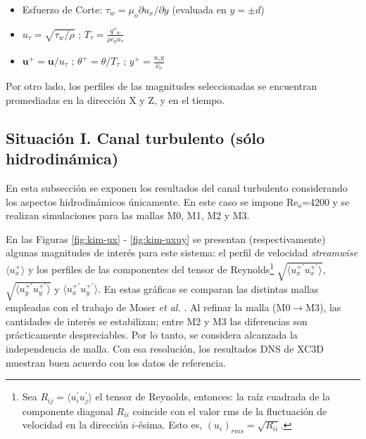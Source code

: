 \begin{itemize}
	\item Esfuerzo de Corte: $\tau_w= \mu_o \partial u_x / \partial y$ (evaluada en $y=\pm d$)  
	\item $u_{\tau} = \sqrt{\tau_w / \rho}$ ; $T_{\tau}=\frac{q''_w}{\rho c_p u_{\tau}}$
	\item $\mathbf{u}^+ = \mathbf{u} / u_{\tau}$ ; $\theta^+ = \theta / T_{\tau}$ ; $y^+ = \frac{u_{\tau} y}{\nu_o}$
\end{itemize}
Por otro lado, los perfiles de las magnitudes seleccionadas se encuentran promediadas en la dirección X y Z, y en el tiempo.

\subsection{Situación I. Canal turbulento (sólo hidrodinámica)}

En esta subsección se exponen los resultados del canal turbulento considerando los \linebreak aspectos hidrodinámicos únicamente. En este caso se impone Re$_o$=4200 y se realizan \linebreak simulaciones para las mallas M0, M1, M2 y M3.  

En las Figuras \ref{fig:kim-ux} - \ref{fig:kim-uxuy} se presentan (respectivamente) algunas magnitudes de interés para este sistema: el perfil de velocidad \textit{streamwise} $\langle u^+_x \rangle$ y los perfiles de las componentes del tensor de Reynolds\footnote{Sea $R_{ij} = \langle u^{\prime}_i u^{\prime}_j \rangle$ el tensor de Reynolds, entonces: la raíz cuadrada de la componente diagonal $R_{ii}$ coincide con el valor rms de la fluctuación de velocidad en la dirección $i$-ésima. Esto es, $(u_i)_{rms} = \sqrt{R_{ii}}$.} $\sqrt{\langle u^{+ \prime}_x u^{+ \prime}_x \rangle}$, $\sqrt{\langle u^{+ \prime}_y u^{+ \prime}_y \rangle}$ y $\langle u^{+ \prime}_x u^{+ \prime}_y \rangle$. En estas gráficas se comparan las distintas mallas empleadas con el trabajo de Moser \textit{et al.} \cite{moser1999}. Al refinar la malla (M0$\rightarrow$M3), las cantidades de interés se estabilizan; entre M2 y M3 las diferencias son prácticamente despreciables. Por lo tanto, se considera alcanzada la independencia de malla. Con esa resolución, los resultados DNS de XC3D muestran buen acuerdo con los datos de referencia.

\newpage

